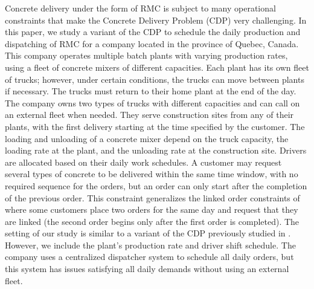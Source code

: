 \documentclass{article}
\begin{document}
Concrete delivery under the form of RMC is subject to many operational constraints that make the Concrete Delivery Problem (CDP) very challenging. In this paper, we study a variant of the CDP to schedule the daily production and dispatching of RMC for a company located in the province of Quebec, Canada. This company operates multiple batch plants with varying production rates, using a fleet of concrete mixers of different capacities. Each plant has its own fleet of trucks; however, under certain conditions, the trucks can move between plants if necessary. The trucks must return to their home plant at the end of the day. The company owns two types of trucks with different capacities and can call on an external fleet when needed. They serve construction sites from any of their plants, with the first delivery starting at the time specified by the customer. The loading and unloading of a concrete mixer depend on the truck capacity, the loading rate at the plant, and the unloading rate at the construction site. Drivers are allocated based on their daily work schedules. A customer may request several types of concrete to be delivered within the same time window, with no required sequence for the orders, but an order can only start after the completion of the previous order. This constraint generalizes the linked order constraints of \cite{durbin2008or} where some customers place two orders for the same day and request that they are linked (the second order begins only after the first order is completed). The setting of our study is similar to a variant of the CDP previously studied in \cite{schmid2009hybrid, schmid2010hybridization}. However, we include the plant's production rate and driver shift schedule. The company uses a centralized dispatcher system to schedule all daily orders, but this system has issues satisfying all daily demands without using an external fleet.
\end{document}
